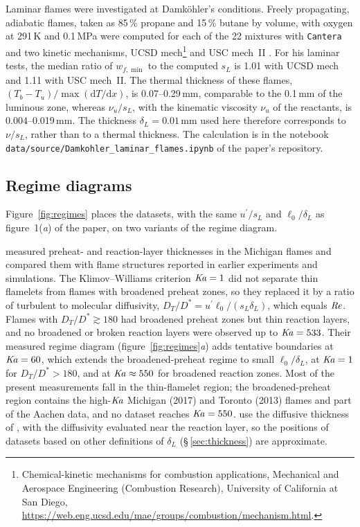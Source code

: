 \documentclass[11pt]{article}
\providecommand{\Rey}{\mbox{\textit{Re}}}
\providecommand{\Ka}{\mbox{\textit{Ka}}}
\newcommand{\sL}{s_L}
\newcommand{\dL}{\delta_L}
\newcommand{\up}{u^{\prime}}
\begin{document}
Laminar flames were investigated at Damk\"ohler's conditions. Freely propagating, adiabatic flames, taken as 85\,\% propane and 15\,\% butane by volume, with oxygen at 291\,K and 0.1\,MPa were computed for each of the 22 mixtures with \texttt{Cantera} \citep{Goodwin2025} and two kinetic mechanisms, UCSD mech\footnote{Chemical-kinetic mechanisms for combustion applications, Mechanical and Aerospace Engineering (Combustion Research), University of California at San Diego, \url{https://web.eng.ucsd.edu/mae/groups/combustion/mechanism.html}.} and USC mech~II \citep{Wang2007}. For his laminar tests, the median ratio of $w_{f,\min}$ to the computed $\sL$ is 1.01 with UCSD mech and 1.11 with USC mech~II. The thermal thickness of these flames, $(T_b - T_u) / \max(\mathrm{d}T / \mathrm{d}x)$, is 0.07--0.29\,mm, comparable to the 0.1\,mm of the luminous zone, whereas $\nu_u / \sL$, with the kinematic viscosity $\nu_u$ of the reactants, is 0.004--0.019\,mm. The thickness $\dL = 0.01$\,mm used here therefore corresponds to $\nu / \sL$, rather than to a thermal thickness. The calculation is in the notebook \texttt{data/source/Damkohler\_laminar\_flames.ipynb} of the paper's repository.

\subsection{Regime diagrams}\label{sec:regimes}

Figure~\ref{fig:regimes} places the datasets, with the same $\up / \sL$ and $\ell_0 / \dL$ as figure~1(\textit{a}) of the paper, on two variants of the regime diagram.

\citet{Skiba2018} measured preheat- and reaction-layer thicknesses in the Michigan flames and compared them with flame structures reported in earlier experiments and simulations. The Klimov--Williams criterion $\Ka = 1$ did not separate thin flamelets from flames with broadened preheat zones, so they replaced it by a ratio of turbulent to molecular diffusivity, $D_T / D^* = \up \ell_0 / (\sL \dL)$, which equals $\Rey$. Flames with $D_T / D^* \gtrsim 180$ had broadened preheat zones but thin reaction layers, and no broadened or broken reaction layers were observed up to $\Ka = 533$. Their measured regime diagram (figure~\ref{fig:regimes}\textit{a}) adds tentative boundaries at $\Ka = 60$, which extends the broadened-preheat regime to small $\ell_0 / \dL$, at $\Ka = 1$ for $D_T / D^* > 180$, and at $\Ka \approx 550$ for broadened reaction zones. Most of the present measurements fall in the thin-flamelet region; the broadened-preheat region contains the high-$\Ka$ Michigan (2017) and Toronto (2013) flames and part of the Aachen data, and no dataset reaches $\Ka = 550$. \citet{Skiba2018} use the diffusive thickness of \citet{Peters2000}, with the diffusivity evaluated near the reaction layer, so the positions of datasets based on other definitions of $\dL$ (\S\,\ref{sec:thickness}) are approximate.
\end{document}
